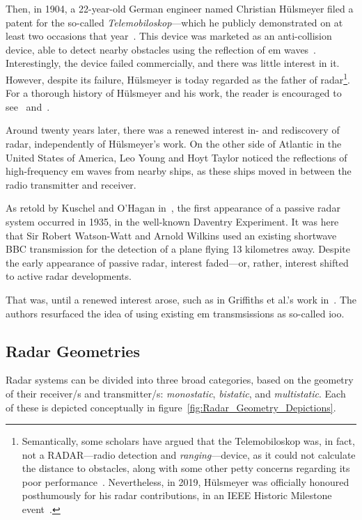 \documentclass[class=report,11pt,crop=false]{standalone}
\begin{document}
Then, in 1904, a 22-year-old German engineer named Christian H\"ulsmeyer filed a patent for the so-called \emph{Telemobiloskop}---which he publicly demonstrated on at least two occasions that year~\cite{Galati2014}. This device was marketed as an anti-collision device, able to detect nearby obstacles using the reflection of \gls{em} waves~\cite{swords1986technical}. Interestingly, the device failed commercially, and there was little interest in it. However, despite its failure, H\"ulsmeyer is today regarded as the father of radar\footnote{Semantically, some scholars have argued that the Telemobiloskop was, in fact, not a RADAR---radio detection and \emph{ranging}---device, as it could not calculate the distance to obstacles, along with some other petty concerns regarding its poor performance~\cite{pritchard1989radar}. Nevertheless, in 2019, H\"ulsmeyer was officially honoured posthumously for his radar contributions, in an IEEE Historic Milestone event~\cite{Griffiths2019}.}. For a thorough history of H\"ulsmeyer and his work, the reader is encouraged to see~\cite{pritchard1989radar} and~\cite{bauer2005christian}.

Around twenty years later, there was a renewed interest in- and rediscovery of radar, independently of H\"ulsmeyer's work. On the other side of Atlantic in the United States of America, Leo Young and Hoyt Taylor noticed the reflections of high-frequency \gls{em} waves from nearby ships, as these ships moved in between the radio transmitter and receiver.

As retold by Kuschel and O'Hagan in~\cite{kuschel-hagan-history}, the first appearance of a passive radar system occurred in 1935, in the well-known Daventry Experiment. It was here that Sir Robert Watson-Watt and Arnold Wilkins used an existing shortwave BBC transmission for the detection of a plane flying 13 kilometres away. Despite the early appearance of passive radar, interest faded---or, rather, interest shifted to active radar developments.

That was, until a renewed interest arose, such as in Griffiths et al.'s work in~\cite{Griffiths1992}. The authors resurfaced the idea of using existing \gls{em} transmsissions as so-called \gls{ioo}.


\subsection{Radar Geometries}

Radar systems can be divided into three broad categories, based on the geometry of their receiver/s and transmitter/s: \emph{monostatic}, \emph{bistatic}, and \emph{multistatic}. Each of these is depicted conceptually in figure~\ref{fig:Radar_Geometry_Depictions}.
\end{document}
